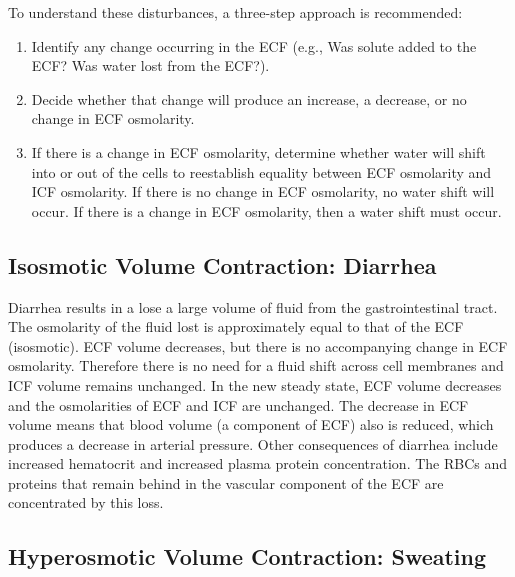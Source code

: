 To understand these disturbances, a three-step approach is recommended:

\begin{enumerate}
\item Identify any change occurring in the ECF (e.g., Was solute added to the ECF? Was water lost from the ECF?).
\item Decide whether that change will produce an increase, a decrease, or no change in ECF osmolarity. 
\item If there is a change in ECF osmolarity, determine whether water will shift into or out of the cells to reestablish equality between ECF osmolarity and ICF osmolarity. If there is no change in ECF osmolarity, no water shift will occur. If there is a change in ECF osmolarity, then a water shift must occur. 
\end{enumerate}

\subsection{Isosmotic Volume Contraction: Diarrhea}

Diarrhea results in a lose a large volume of fluid from the gastrointestinal tract. The osmolarity of the fluid lost is approximately equal to that of the ECF (isosmotic).  ECF volume decreases, but there is no accompanying change in ECF osmolarity. Therefore there is no need for a fluid shift across cell membranes and ICF volume remains unchanged. In the new steady state, ECF volume decreases and the osmolarities of ECF and ICF are unchanged. The decrease in ECF volume means that blood volume (a component of ECF) also is reduced, which produces a decrease in arterial pressure. Other consequences of diarrhea include increased hematocrit and increased plasma protein concentration. The RBCs and proteins that remain behind in the vascular component of the ECF are concentrated by this loss. 

\subsection{Hyperosmotic Volume Contraction: Sweating}

